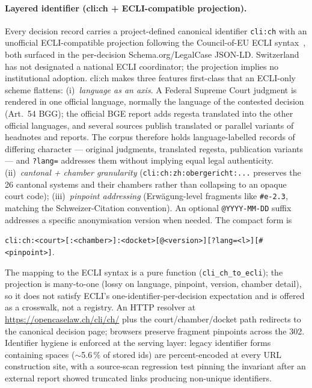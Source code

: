 \documentclass[11pt,a4paper]{article}
\begin{document}
\paragraph{Layered identifier (cli:ch + ECLI-compatible projection).} Every decision record carries a project-defined canonical identifier \texttt{cli:ch} with an unofficial ECLI-compatible projection following the Council-of-EU ECLI syntax~\citep{ecli2011}, both surfaced in the per-decision Schema.org/LegalCase JSON-LD. Switzerland has not designated a national ECLI coordinator; the projection implies no institutional adoption. cli:ch makes three features first-class that an ECLI-only scheme flattens: (i)~\emph{language as an axis}. A Federal Supreme Court judgment is rendered in one official language, normally the language of the contested decision (Art.~54 BGG); the official BGE report adds regesta translated into the other official languages, and several sources publish translated or parallel variants of headnotes and reports. The corpus therefore holds language-labelled records of differing character --- original judgments, translated regesta, publication variants --- and \texttt{?lang=} addresses them without implying equal legal authenticity. (ii)~\emph{cantonal + chamber granularity} (\texttt{cli:ch:zh:obergericht:...} preserves the 26 cantonal systems and their chambers rather than collapsing to an opaque court code); (iii)~\emph{pinpoint addressing} (Erwägung-level fragments like \texttt{\#e-2.3}, matching the Schweizer-Citation convention). An optional \texttt{@YYYY-MM-DD} suffix addresses a specific anonymisation version when needed. The compact form is
\begin{center}
\texttt{cli:ch:<court>[:<chamber>]:<docket>[@<version>][?lang=<l>][\#<pinpoint>]}.
\end{center}
The mapping to the ECLI syntax is a pure function (\texttt{cli\_ch\_to\_ecli}); the projection is many-to-one (lossy on language, pinpoint, version, chamber detail), so it does not satisfy ECLI's one-identifier-per-decision expectation and is offered as a crosswalk, not a registry. An HTTP resolver at \url{https://opencaselaw.ch/cli/ch/} plus the court/chamber/docket path redirects to the canonical decision page; browsers preserve fragment pinpoints across the 302. Identifier hygiene is enforced at the serving layer: legacy identifier forms containing spaces ($\sim$5.6\,\% of stored ids) are percent-encoded at every URL construction site, with a source-scan regression test pinning the invariant after an external report showed truncated links producing non-unique identifiers.
\end{document}

